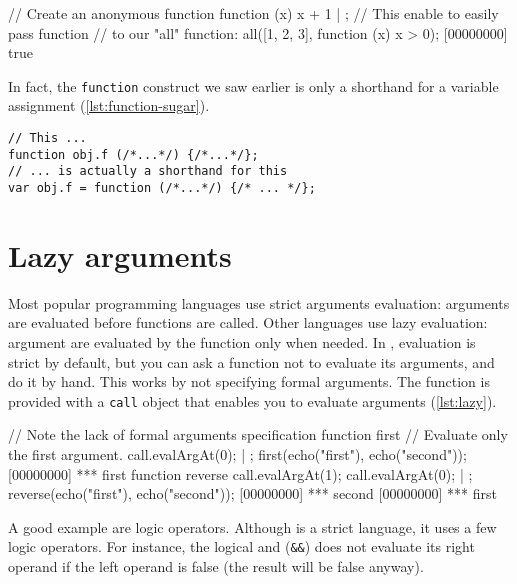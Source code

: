 \documentclass[openright,twoside,12pt]{report}
\begin{document}
\begin{urbiscript}[caption=Lambda function, label=lst:lambda, name=all]
// Create an anonymous function
function (x) {x + 1} | {};
// This enable to easily pass function
// to our "all" function:
all([1, 2, 3], function (x) { x > 0});
[00000000] true
\end{urbiscript}

In fact, the \texttt{function} construct we saw earlier is only a
shorthand for a variable assignment (\autoref{lst:function-sugar}).

\begin{lstlisting}[caption=The function sugar,
  label=lst:function-sugar]
// This ...
function obj.f (/*...*/) {/*...*/};
// ... is actually a shorthand for this
var obj.f = function (/*...*/) {/* ... */};
\end{lstlisting}

\section{Lazy arguments}

Most popular programming languages use strict arguments evaluation:
arguments are evaluated before functions are called. Other languages
use lazy evaluation: argument are evaluated by the function only when
needed. In \urbi, evaluation is strict by default, but you can ask a
function not to evaluate its arguments, and do it by hand. This works
by not specifying formal arguments. The function is provided with a
\texttt{call} object that enables you to evaluate arguments
(\autoref{lst:lazy}).

\begin{urbiscript}[caption=Tweaking arguments evaluation,
  label=lst:lazy]
// Note the lack of formal arguments specification
function first
{
  // Evaluate only the first argument.
  call.evalArgAt(0);
} | {};
first(echo("first"), echo("second"));
[00000000] *** first
function reverse
{
  call.evalArgAt(1);
  call.evalArgAt(0);
} | {};
reverse(echo("first"), echo("second"));
[00000000] *** second
[00000000] *** first
\end{urbiscript}

A good example are logic operators. Although \Cxx is a strict
language, it uses a few logic operators. For instance, the logical and
(\texttt{\&\&}) does not evaluate its right operand if the left
operand is false (the result will be false anyway).
\end{document}
